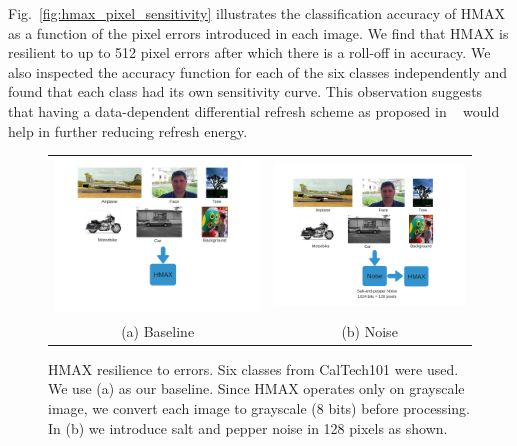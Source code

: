 Fig.~\ref{fig:hmax_pixel_sensitivity} illustrates the classification accuracy of HMAX as a 
function of the pixel errors introduced in each image.
We find that HMAX is resilient to up to 512 pixel errors after which there is a roll-off in accuracy. 
We also inspected the accuracy function for each of the six classes independently and found that each class had its own sensitivity curve. This observation suggests 
that having a data-dependent differential refresh scheme as proposed in ~\cite{iccd2014} would help in further reducing refresh energy.

\begin{figure}[!htb]
\centering
\begin{tabular}{@{}c@{} @{}c@{}}
\includegraphics[width=0.45\linewidth]{./figures/hmax_reliability_a.png} & \includegraphics[width=0.45\linewidth]{./figures/hmax_reliability_b.png}\\[\abovecaptionskip]
\small (a) Baseline & \small (b) Noise
\end{tabular}
\vspace{1pt}
\caption{HMAX resilience to errors. Six classes from CalTech101 were used. We use (a) as our baseline. Since HMAX operates only on grayscale image, we convert each image to grayscale (8 bits) before processing. In (b) we introduce salt and pepper noise in 128 pixels as shown.}
\label{tab:hmax_reliability}
\end{figure}

